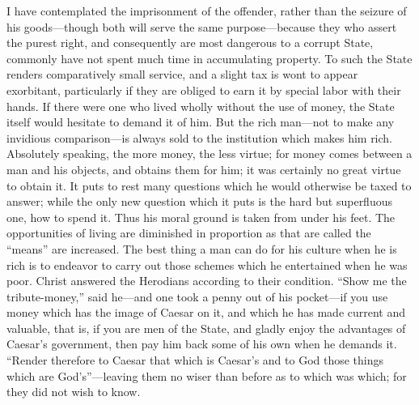 \documentclass[letterpaper,12pt]{article}
\begin{document}
I have contemplated the imprisonment of the offender, rather than the seizure of
his goods---though both will serve the same purpose---because they who assert
the purest right, and consequently are most dangerous to a corrupt State,
commonly have not spent much time in accumulating property. To such the State
renders comparatively small service, and a slight tax is wont to appear
exorbitant, particularly if they are obliged to earn it by special labor with
their hands. If there were one who lived wholly without the use of money, the
State itself would hesitate to demand it of him. But the rich man---not to make
any invidious comparison---is always sold to the institution which makes him
rich.  Absolutely speaking, the more money, the less virtue; for money comes
between a man and his objects, and obtains them for him; it was certainly no
great virtue to obtain it. It puts to rest many questions which he would
otherwise be taxed to answer; while the only new question which it puts is the
hard but superfluous one, how to spend it. Thus his moral ground is taken from
under his feet. The opportunities of living are diminished in proportion as that
are called the \enquote{means} are increased. The best thing a man can do for
his culture when he is rich is to endeavor to carry out those schemes which he
entertained when he was poor.  Christ answered the Herodians according to their
condition.  \enquote{Show me the tribute-money,} said he---and one took a penny
out of his pocket---if you use money which has the image of Caesar on it, and
which he has made current and valuable, that is, if you are men of the State,
and gladly enjoy the advantages of Caesar's government, then pay him back some
of his own when he demands it. \enquote{Render therefore to Caesar that which is
    Caesar's and to God those things which are God's}---leaving them no wiser
than before as to which was which; for they did not wish to know.
\end{document}
